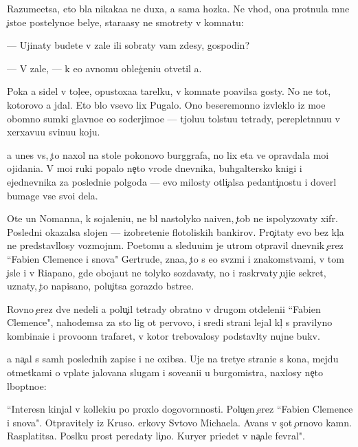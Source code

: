 \documentclass[10pt]{book}
\begin{document}
Razume{\y}etsa, eto b{\yi}la nikaka{\y}a ne duxa, a sama hoz{\ia}{\y}ka. Ne vhod{\ia}, ona prot{\ia}nula mne {\c}isto{\y}e postelyno{\y}e belye, stara{\y}asy ne smotrety v komnatu:

— Ujinaty budete v zale ili sobraty vam zdesy, gospodin?

— V zale, — k {\y}e{\y}o {\y}avnomu obleg{\c}eni{\y}u otvetil {\y}a.

Poka {\y}a sidel v tol{\c}e{\y}e, opustoxa{\y}a tarelku, v komnate po{\y}avilsa gosty. No ne tot, kotorovo {\y}a jdal. Eto b{\yi}lo vsevo lix Pugalo. Ono bes{\q}eremonno izvleklo iz mo{\y}e{\y} ob{\y}omno{\y} sumki glavno{\y}e {\y}e{\y}o soderjimo{\y}e — t{\ia}jolu{\y}u tolstu{\y}u tetrady, pereplet{\e}nnu{\y}u v xerxavu{\y}u svinu{\y}u koju.

{\Y}a unes vs{\e}, {\c}to naxol na stole poko{\y}novo burggrafa, no lix eta ve{\x} opravdala mo{\y}i ojidani{\y}a. V mo{\y}i ruki popalo ne{\c}to vrode dnevnika, buhgaltersko{\y} knigi i {\y}ejednevnika za posledni{\y}e polgoda — {\y}evo milosty otli{\c}alsa pedanti{\c}nost{\y}u i dover{\ia}l bumage vse svo{\y}i dela.

Ote{\q} un Nomanna, k sojaleni{\y}u, ne b{\yi}l nastolyko naiven, {\c}tob{\yi} ne ispolyzovaty xifr. Posledni{\y} okazalsa slojen — izobreteni{\y}e flotoli{\y}skih bankirov. Pro{\c}itaty {\y}evo bez kl{\iu}{\c}a ne predstavl{\ia}losy vozmojn{\yi}m. Poetomu {\y}a sledu{\y}u{\x}im je utrom otpravil dnevnik {\c}erez ``Fabien Clemence i s{\yi}nov{\y}a" Gertrude, zna{\y}a, {\c}to s {\y}e{\y}o sv{\ia}z{\ia}mi i znakomstvami, v tom {\c}isle i v Riapano, gde oboja{\y}ut ne tolyko sozdavaty, no i raskr{\yi}vaty {\c}uji{\y}e sekret{\yi}, uznaty, {\c}to napisano, polu{\c}itsa gorazdo b{\yi}stre{\y}e.

Rovno {\c}erez dve nedeli {\y}a polu{\c}il tetrady obratno v drugom otdeleni{\y}i ``Fabien Clemence", nahod{\ia}{\x}emsa za sto lig ot pervovo, i sredi strani{\q} lejal kl{\iu}{\c} s pravilyno{\y} kombina{\q}i{\y}e{\y} i provo{\x}onn{\yi}{\y} trafaret, v kotor{\yi}{\y} trebovalosy podstavl{\ia}ty nujn{\yi}{\y}e bukv{\yi}.

{\Y}a na{\c}al s sam{\yi}h poslednih zapise{\y} i ne oxibsa. Uje na tretye{\y} strani{\q}e s kon{\q}a, mejdu otmetkami o v{\yi}plate jalovan{\y}a slugam i sove{\x}ani{\y}i u burgomistra, naxlosy ne{\c}to l{\iu}bop{\yi}tno{\y}e:

``Interesn{\yi}{\y} kinjal v kollek{\q}i{\y}u po proxlo{\y} dogovor{\e}nnosti. Polu{\c}en {\c}erez ``Fabien Clemence i s{\yi}nov{\y}a". Otpravitely iz Kruso. {\Q}erkovy Sv{\ia}tovo Michaela. Avans v s{\c}ot {\c}ornovo kamn{\ia}. Rasplatitsa. Pos{\yi}lku pros{\ia}t peredaty li{\c}no. Kuryer pri{\y}edet v na{\c}ale fevral{\ia}".
\end{document}
